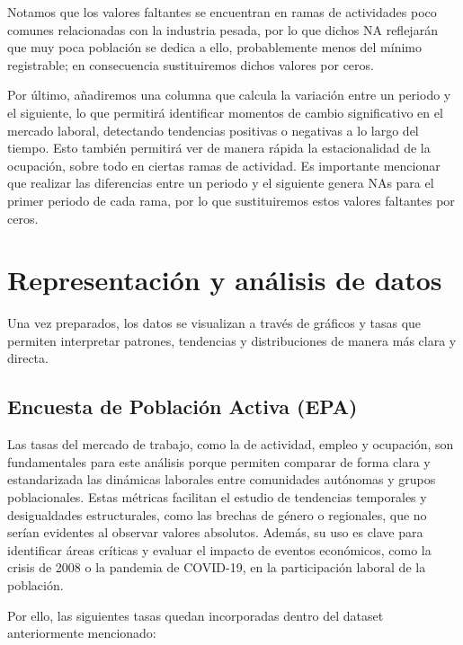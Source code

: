 \documentclass[Universitat de
València,article,submit,moreauthors,pdftex]{Definitions/mdpi}
\begin{document}
Notamos que los valores faltantes se encuentran en ramas de actividades
poco comunes relacionadas con la industria pesada, por lo que dichos NA
reflejarán que muy poca población se dedica a ello, probablemente menos
del mínimo registrable; en consecuencia sustituiremos dichos valores por
ceros.

Por último, añadiremos una columna que calcula la variación entre un
periodo y el siguiente, lo que permitirá identificar momentos de cambio
significativo en el mercado laboral, detectando tendencias positivas o
negativas a lo largo del tiempo. Esto también permitirá ver de manera
rápida la estacionalidad de la ocupación, sobre todo en ciertas ramas de
actividad. Es importante mencionar que realizar las diferencias entre un
periodo y el siguiente genera NAs para el primer periodo de cada rama,
por lo que sustituiremos estos valores faltantes por ceros.

\section{Representación y análisis de
datos}\label{representaciuxf3n-y-anuxe1lisis-de-datos}

Una vez preparados, los datos se visualizan a través de gráficos y tasas
que permiten interpretar patrones, tendencias y distribuciones de manera
más clara y directa.

\subsection{\texorpdfstring{\textbf{Encuesta de Población Activa
(EPA)}}{Encuesta de Población Activa (EPA)}}\label{encuesta-de-poblaciuxf3n-activa-epa-1}

Las tasas del mercado de trabajo, como la de actividad, empleo y
ocupación, son fundamentales para este análisis porque permiten comparar
de forma clara y estandarizada las dinámicas laborales entre comunidades
autónomas y grupos poblacionales. Estas métricas facilitan el estudio de
tendencias temporales y desigualdades estructurales, como las brechas de
género o regionales, que no serían evidentes al observar valores
absolutos. Además, su uso es clave para identificar áreas críticas y
evaluar el impacto de eventos económicos, como la crisis de 2008 o la
pandemia de COVID-19, en la participación laboral de la población.

Por ello, las siguientes tasas quedan incorporadas dentro del dataset
anteriormente mencionado:
\end{document}
